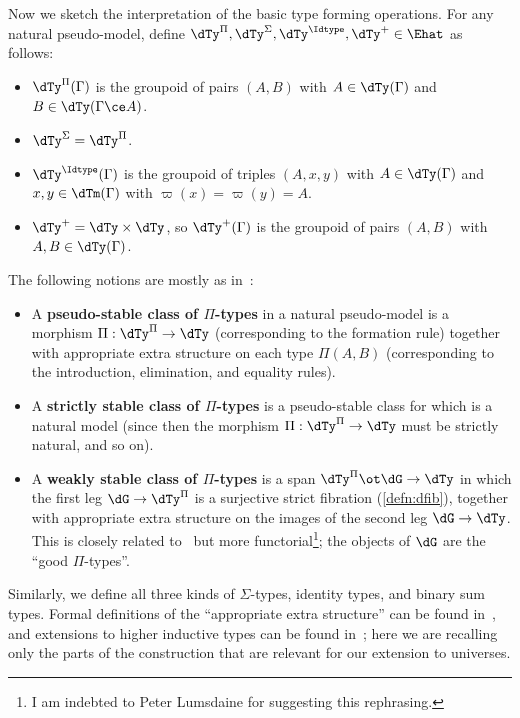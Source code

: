 Now we sketch the interpretation of the basic type forming operations.
For any natural pseudo-model, define $\dTy^\Pi,\dTy^\Sigma,\dTy^{\Idtype},\dTy^{+} \in\Ehat$ as follows:
\begin{itemize}
\item $\dTy^\Pi(\Gamma)$ is the groupoid of pairs $(A,B)$ with $A\in \dTy(\Gamma)$ and $B\in \dTy(\Gamma\ce A)$.
\item $\dTy^\Sigma = \dTy^\Pi$.
\item $\dTy^{\Idtype}(\Gamma)$ is the groupoid of triples $(A,x,y)$ with $A\in \dTy(\Gamma)$ and $x,y\in \dTm(\Gamma)$ with $\varpi(x)=\varpi(y)=A$. %
\item $\dTy^{+} = \dTy\times\dTy$, so $\dTy^+(\Gamma)$ is the groupoid of pairs $(A,B)$ with $A,B\in\dTy(\Gamma)$.
\end{itemize}
The following notions are mostly as in~\cite[Definition 3.4.2.8]{lw:localuniv}:
\begin{itemize}
\item A \textbf{pseudo-stable class of $\Pi$-types} in a natural pseudo-model is a morphism $\Pi:\dTy^\Pi \to \dTy$ (corresponding to the formation rule) together with appropriate extra structure on each type $\Pi(A,B)$ (corresponding to the introduction, elimination, and equality rules).
\item A \textbf{strictly stable class of $\Pi$-types} is a pseudo-stable class for which \dTy is a natural model (since then the morphism $\Pi:\dTy^\Pi \to \dTy$ must be strictly natural, and so on).
\item A \textbf{weakly stable class of $\Pi$-types} is a span $\dTy^\Pi \ot \dG \to \dTy$ in which the first leg $\dG \to \dTy^\Pi$ is a surjective strict fibration (\cref{defn:dfib}), together with appropriate extra structure on the images of the second leg $\dG\to\dTy$.
  This is closely related to~\cite[Definition 3.4.2.5]{lw:localuniv} but more functorial\footnote{I am indebted to Peter Lumsdaine for suggesting this rephrasing.}; the objects of $\dG$ are the ``good $\Pi$-types''.
\end{itemize}
Similarly, we define all three kinds of $\Sigma$-types, identity types, and binary sum types.
Formal definitions of the ``appropriate extra structure'' can be found in~\cite{lw:localuniv}, and extensions to higher inductive types can be found in~\cite{ls:hits}; here we are recalling only the parts of the construction that are relevant for our extension to universes.

